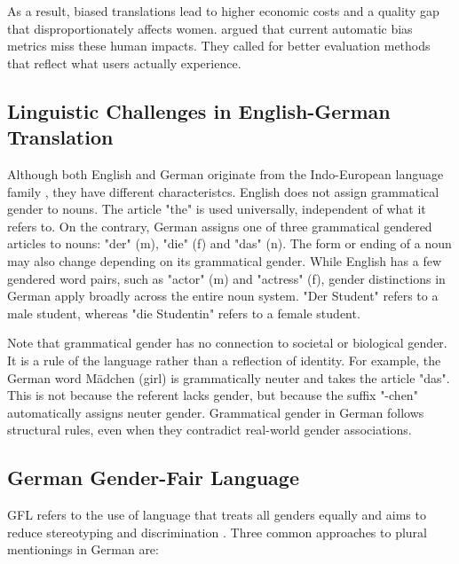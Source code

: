         As a result, biased translations lead to higher economic costs and a quality gap that disproportionately affects women. \textcite{savoldiWhatHarmQuantifying2024} argued that current automatic bias metrics miss these human impacts. They called for better evaluation methods that reflect what users actually experience.

    \subsection{Linguistic Challenges in English-German Translation}
        Although both English and German originate from the Indo-European language family \parencite{baldiEnglishIndoEuropeanLanguage2008}, they have different characteristcs. English does not assign grammatical gender to nouns. The article "the" is used universally, independent of what it refers to. On the contrary, German assigns one of three grammatical gendered articles to nouns: "der" (m), "die" (f) and "das" (n). The form or ending of a noun may also change depending on its grammatical gender. While English has a few gendered word pairs, such as "actor" (m) and "actress" (f), gender distinctions in German apply broadly across the entire noun system. "Der Student" refers to a male student, whereas "die Studentin" refers to a female student. 

        Note that grammatical gender has no connection to societal or biological gender. It is a rule of the language rather than a reflection of identity. For example, the German word Mädchen (girl) is grammatically neuter and takes the article "das". This is not because the referent lacks gender, but because the suffix "-chen" automatically assigns neuter gender. Grammatical gender in German follows structural rules, even when they contradict real-world gender associations.

    \subsection{German Gender-Fair Language} \label{subsection:german_gfl}
    GFL refers to the use of language that treats all genders equally and aims to reduce stereotyping and discrimination \parencite{sczesnyCanGenderFairLanguage2016}. Three common approaches to plural mentionings in German are: 

